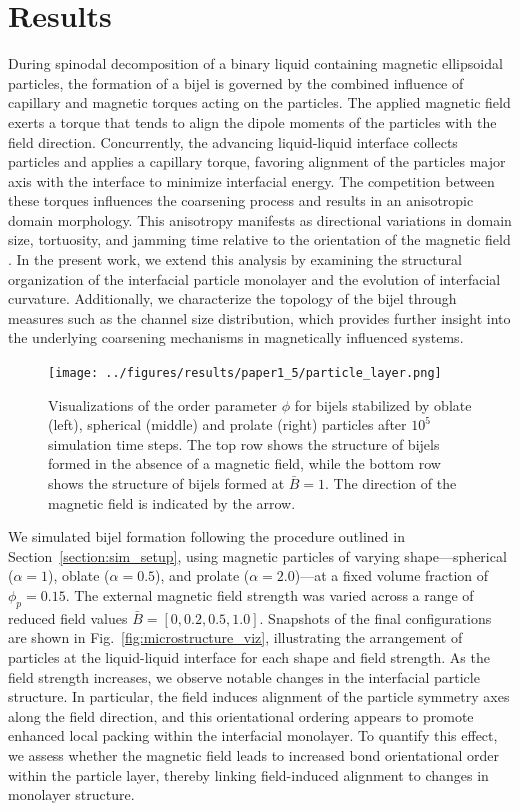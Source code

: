 \section{Results}

During spinodal decomposition of a binary liquid containing magnetic ellipsoidal particles, the formation of a bijel is governed by the combined influence of capillary and magnetic torques acting on 
the particles. The applied magnetic field exerts a torque that tends to align the dipole moments of the particles with the field direction. Concurrently, the advancing liquid-liquid interface collects 
particles and applies a capillary torque, favoring alignment of the particles major axis with the interface to minimize interfacial energy. The competition between these torques influences the 
coarsening process and results in an anisotropic domain morphology. This anisotropy manifests as directional variations in domain size, tortuosity, and jamming time relative to the orientation of 
the magnetic field \cite{karthikeyan_formation_2024}. In the present work, we extend this analysis by examining the structural organization of the interfacial particle monolayer and the evolution 
of interfacial curvature. Additionally, we characterize the topology of the bijel through measures such as the channel size distribution, which provides further insight into the underlying coarsening 
mechanisms in magnetically influenced systems.

\begin{figure}
\texttt{[image: ../figures/results/paper1\_5/particle\_layer.png]}%
\caption{Visualizations of the order parameter $\phi$ for bijels stabilized by oblate (left), spherical (middle) and prolate (right) particles 
         after $10^5$ simulation time steps. The top row shows the structure of bijels formed in the 
         absence of a magnetic field, while the bottom row shows the structure of bijels formed at $\bar{B} = 1$. 
         The direction of the magnetic field is indicated by the arrow.
\label{fig:particle_layer}}%
\end{figure}

We simulated bijel formation following the procedure outlined in Section~\ref{section:sim_setup}, using magnetic particles of varying shape—spherical (\(\alpha = 1\)), oblate (\(\alpha = 0.5\)), 
and prolate (\(\alpha = 2.0\))—at a fixed volume fraction of \(\phi_p = 0.15\). The external magnetic field strength was varied across a range of reduced field values \(\bar{B} = [0, 0.2, 0.5, 1.0]\). 
Snapshots of the final configurations are shown in Fig.~\ref{fig:microstructure_viz}, illustrating the arrangement of particles at the liquid-liquid interface for each shape and field strength. As the 
field strength increases, we observe notable changes in the interfacial particle structure. In particular, the field induces alignment of the particle symmetry axes along the field direction, and this 
orientational ordering appears to promote enhanced local packing within the interfacial monolayer. To quantify this effect, we assess whether the magnetic field leads to increased bond orientational 
order within the particle layer, thereby linking field-induced alignment to changes in monolayer structure.

